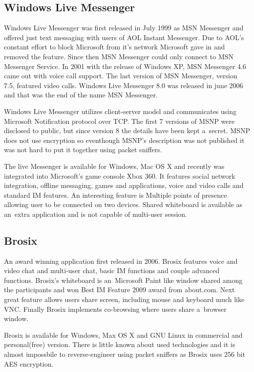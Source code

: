 \subsection*{Windows Live Messenger}
Windows Live Messenger was first released in July 1999 as MSN Messenger and offered just text messaging with users of AOL Instant Messenger\cite{AIM}. Due to AOL's constant effort to block Microsoft from it's network Microsoft gave in and removed the feature. Since then MSN Messenger could only connect to MSN Messenger Service. In 2001 with the release of Windows XP, MSN Messenger 4.6 came out with voice call support. The last version of MSN Messenger, version 7.5, featured video calls. Windows Live Messenger 8.0 was released in june 2006 and that was the end of the name MSN Messenger.   

Windows Live Messenger utilizes client-server model and communicates using Microsoft Notification protocol over TCP. The first 7 versions of MSNP were disclosed to public, but since version 8 the details have been kept a~secret. MSNP does not use encryption so eventhough MSNP's description was not published it was not hard to put it together using packet sniffers.

The live Messenger is available for Windows, Mac OS X and recently was integrated into Microsoft's game console Xbox 360. It features social network integration, offline messaging, games and applications, voice and video calls and standard IM features. An interesting feature is Multiple points of presence allowing user to be connected on two devices. Shared whiteboard is available as an~extra application and is not capable of multi-user session.   

\subsection*{Brosix}
An award winning application first released in 2006. Brosix features voice and video chat and multi-user chat, basic IM functions and couple advanced functions. Brosix's whiteboard is an~Microsoft Paint like window shared among the participants and won Best IM Feature 2009 award from about.com. Next great feature allows users share screen, including mouse and keyboard much like VNC. Finally Brosix implements co-browsing where users share a~browser window. 

Brosix is available for Windows, Max OS X and GNU Linux in commercial and personal(free) version. There is little known about used technologies and it is almost impossbile to reverse-engineer using packet sniffers as Brosix uses 256 bit AES encryption.

